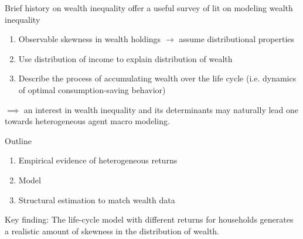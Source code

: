 \documentclass{beamer}
\begin{document}




    


\begin{frame}{Brief history on wealth inequality}
\cite{jbab18} offer a useful survey of lit on modeling wealth inequality
\begin{enumerate}
\item Observable skewness in wealth holdings $\rightarrow$ assume distributional properties
\item Use distribution of income to explain distribution of wealth
\item Describe the process of accumulating wealth over the life cycle (i.e. dynamics of optimal consumption-saving behavior)
\end{enumerate}

\vspace{2.5mm}
$\implies$ an interest in wealth inequality and its determinants may naturally lead one towards heterogeneous agent macro modeling.

\end{frame}


\begin{frame}{Outline}
\begin{enumerate}
\item Empirical evidence of heterogeneous returns
\item Model
\item Structural estimation to match wealth data
\end{enumerate}

\vspace{2.5mm}
Key finding: The life-cycle model with different returns for households generates a realistic amount of skewness in the distribution of wealth.


\end{frame}
\end{document}
